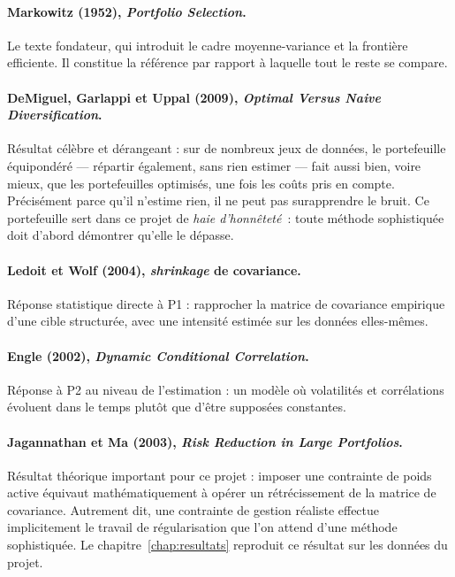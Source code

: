 \paragraph{Markowitz (1952), \emph{Portfolio Selection}.} Le texte fondateur, qui
introduit le cadre moyenne-variance et la frontière efficiente. Il constitue la
référence par rapport à laquelle tout le reste se compare.

\paragraph{DeMiguel, Garlappi et Uppal (2009), \emph{Optimal Versus Naive
Diversification}.} Résultat célèbre et dérangeant : sur de nombreux jeux de
données, le portefeuille équipondéré — répartir également, sans rien estimer —
fait aussi bien, voire mieux, que les portefeuilles optimisés, une fois les coûts
pris en compte. Précisément parce qu'il n'estime rien, il ne peut pas
surapprendre le bruit. Ce portefeuille sert dans ce projet de \emph{haie
d'honnêteté}~: toute méthode sophistiquée doit d'abord démontrer qu'elle le
dépasse.

\paragraph{Ledoit et Wolf (2004), \emph{shrinkage} de covariance.} Réponse
statistique directe à P1 : rapprocher la matrice de covariance empirique d'une
cible structurée, avec une intensité estimée sur les données elles-mêmes.

\paragraph{Engle (2002), \emph{Dynamic Conditional Correlation}.} Réponse à P2 au
niveau de l'estimation : un modèle où volatilités et corrélations évoluent dans le
temps plutôt que d'être supposées constantes.

\paragraph{Jagannathan et Ma (2003), \emph{Risk Reduction in Large Portfolios}.}
Résultat théorique important pour ce projet : imposer une contrainte de poids
active équivaut mathématiquement à opérer un rétrécissement de la matrice de
covariance. Autrement dit, une contrainte de gestion réaliste effectue
implicitement le travail de régularisation que l'on attend d'une méthode
sophistiquée. Le chapitre~\ref{chap:resultats} reproduit ce résultat sur les
données du projet.

